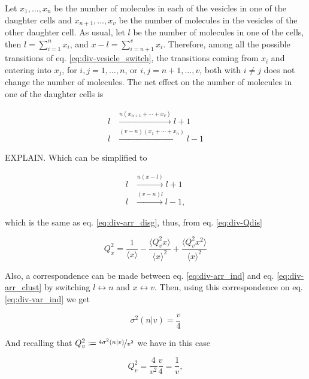 Let $x_1,\dotsc,x_n$ be the number of molecules in each of the vesicles in one of the daughter cells and $x_{n+1},\dotsc,x_v$ be the number of molecules in the vesicles of the other daughter cell. As usual, let $l$ be the number of molecules in one of the cells, then $l = \sum_{i=1}^nx_i$, and $x-l = \sum_{i=n+1}^vx_i$. Therefore, among all the possible transitions of eq. \eqref{eq:div-vesicle_switch}, the transitions coming from $x_i$ and entering into $x_j$, for $i,j=1,\dotsc,n$, or $i,j=n+1,\dotsc,v$, both with $i\neq j$ does not change the number of molecules. The net effect on the number of molecules in one of the daughter cells is

\begin{equation}
  \begin{split}
    l&\xrightarrow{n(x_{n+1}+\dotsb+x_{v})}l+1\\
    l&\xrightarrow{(v-n)(x_1+\dotsb+x_n)}l-1
  \end{split}
\end{equation}

EXPLAIN. Which can be simplified to

\begin{equation}
  \begin{split}
    l&\xrightarrow{n(x-l)}l+1\\
    l&\xrightarrow{(v-n)l}l-1,
  \end{split}
\end{equation}

which is the same as eq. \eqref{eq:div-arr_disg}, thus, from eq. \eqref{eq:div-Qdis}

\begin{equation}
  \label{eq:div-clus-Qx1}
  Q_x^2 = \frac{1}{\langle x\rangle} - \frac{\langle Q_v^2x\rangle}{\langle x\rangle^2} + \frac{\langle Q_v^2x^2\rangle}{\langle x\rangle^2}
\end{equation}

Also, a correspondence can be made between eq. \eqref{eq:div-arr_ind} and eq. \eqref{eq:div-arr_clust} by switching $l\leftrightarrow n$ and $x\leftrightarrow v$. Then, using this correspondence on eq. \eqref{eq:div-var_ind} we get 

\begin{equation}
  \sigma^2(n|v) = \frac{v}{4}
\end{equation}

And recalling that $Q_v^2 \coloneqq \nicefrac{4\sigma^2(n|v)}{v^2}$ we have in this case

\begin{equation}
  Q_v^2 = \frac{4}{v^2}\frac{v}{4} = \frac{1}{v},
\end{equation}

